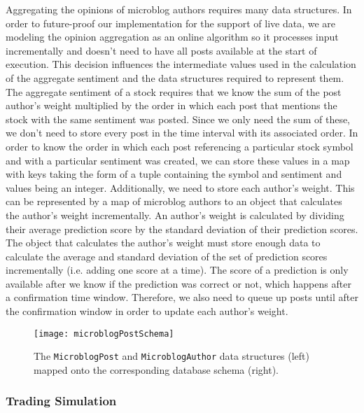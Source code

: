 Aggregating the opinions of microblog authors requires many data structures.
In order to future-proof our implementation for the support of live data, we are modeling the opinion aggregation as an online algorithm so it processes input incrementally and doesn't need to have all posts available at the start of execution.
This decision influences the intermediate values used in the calculation of the aggregate sentiment and the data structures required to represent them.
The aggregate sentiment of a stock requires that we know the sum of the post author's weight multiplied by the order in which each post that mentions the stock with the same sentiment was posted.
Since we only need the sum of these, we don't need to store every post in the time interval with its associated order.
In order to know the order in which each post referencing a particular stock symbol and with a particular sentiment was created, we can store these values in a map with keys taking the form of a tuple containing the symbol and sentiment and values being an integer.
Additionally, we need to store each author's weight.
This can be represented by a map of microblog authors to an object that calculates the author's weight incrementally.
An author's weight is calculated by dividing their average prediction score by the standard deviation of their prediction scores.
The object that calculates the author's weight must store enough data to calculate the average and standard deviation of the set of prediction scores incrementally (i.e. adding one score at a time).
The score of a prediction is only available after we know if the prediction was correct or not, which happens after a confirmation time window.
Therefore, we also need to queue up posts until after the confirmation window in order to update each author's weight.

\begin{figure}[h]
  \label{microblogPostSchema}
  \begin{center}
    \texttt{[image: microblogPostSchema]}
  \end{center}
  \caption{The \texttt{MicroblogPost} and \texttt{MicroblogAuthor} data structures (left) mapped onto the corresponding database schema (right).}
\end{figure}

\subsubsection{Trading Simulation}

